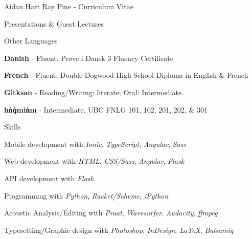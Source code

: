 \documentclass[12pt]{letter}
\begin{document}
\begin{cv}{ Aidan Hart Ray Pine  \space - \space   Curriculum Vitae}
\begin{cvlist}{Presentations \& Guest Lectures}
        \end{cvlist}
        \begin{cvlist}{Other Languages}
                            \item \textbf{Danish} - Fluent. Pr{\o}ve i Dansk 3 Fluency Certificate
                            \item \textbf{French} - Fluent. Double Dogwood High School Diploma in English \& French
                            \item \textbf{Gitksan} - Reading/Writing: literate; Oral: Intermediate. 
                            \item \textbf{h{\textschwa}n̓q̓{\textschwa}min̓{\textschwa}m} - Intermediate. UBC FNLG 101, 102, 201, 202, \& 301
                    \end{cvlist}
        
         \begin{cvlist}{Skills}
                        \item Mobile development with  \textit{Ionic},  \textit{TypeScript},  \textit{Angular},  \textit{Sass}                         \item Web development with  \textit{HTML},  \textit{CSS/Sass},  \textit{Angular},  \textit{Flask}                         \item API development with  \textit{Flask}                         \item Programming with  \textit{Python},  \textit{Racket/Scheme},  \textit{iPython}                         \item Acoustic Analysis/Editing with  \textit{Praat},  \textit{Wavesurfer},  \textit{Audacity},  \textit{ffmpeg}                         \item Typesetting/Graphic design with  \textit{Photoshop},  \textit{InDesign},  \textit{\LaTeX},  \textit{Balsamiq}                      \end{cvlist}


\end{cv}
\end{document}
